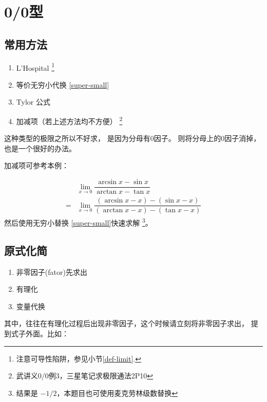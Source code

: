 \section{0/0型}
\label{0-slash-0-type-limits}
\subsection{常用方法}
\begin{enumerate}
    \item L'Hospital \footnote{注意可导性陷阱，参见小节\ref{def-limit}.}
	\item 等价无穷小代换 \ref{super-small}
	\item Tylor 公式
	\item 加减项（若上述方法均不方便）
        \footnote{武讲义0/0例3，三星笔记求极限通法2P10}
\end{enumerate}

这种类型的极限之所以不好求，
是因为分母有0因子。
则将分母上的0因子消掉，也是一个很好的办法。

加减项可参考本例：
\begin{example}
    \begin{align*}
        &\lim_{x \to 0} \dfrac{\arcsin{x} - \sin{x}}{\arctan{x} - \tan{x}} \\
        = &\lim_{x \to 0} \dfrac{(\arcsin{x} -x) - (\sin{x}-x)}{(\arctan{x}-x) - (\tan{x}-x)}
    \end{align*}
    然后使用无穷小替换
    \ref{super-small}快速求解
    \footnote{结果是 $-1/2$，本题目也可使用麦克劳林级数替换}。
\end{example}

\subsection{原式化简}
\begin{enumerate}
	\item 非零因子(fator)先求出 \label{non-zero-factor}
	\item 有理化
	\item 变量代换
\end{enumerate}

其中，往往在有理化过程后出现非零因子，这个时候请立刻将非零因子求出，
提到式子外面。比如：

